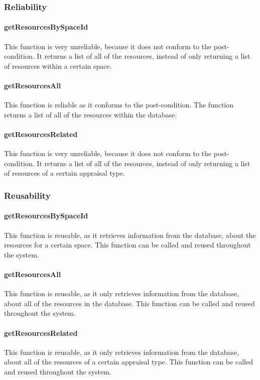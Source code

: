\documentclass[a4paper]{article}
\begin{document}
\subsubsection {Reliability}

\paragraph{getResourcesBySpaceId}
This function is very unreliable, because it does not conform to the post-condition. It returns a list of all of the resources, instead of only returning a list of resources within a certain space.

\paragraph{getResourcesAll}
This function is reliable as it conforms to the post-condition. The function returns a list of all of the resources within the database.

\paragraph{getResourcesRelated}
This function is very unreliable, because it does not conform to the post-condition. It returns a list of all of the resources, instead of only returning a list of resources of a certain appraisal type.

\subsubsection {Reusability}

\paragraph{getResourcesBySpaceId}
This function is reusable, as it retrieves information from the database, about the resources for a certain space. This function can be called and reused throughout the system.

\paragraph{getResourcesAll}
This function is reusable, as it only retrieves information from the database, about all of the resources in the database. This function can be called and reused throughout the system.

\paragraph{getResourcesRelated}
This function is reusable, as it only retrieves information from the database, about all of the resources of a certain appraisal type. This function can be called and reused throughout the system.
\end{document}
